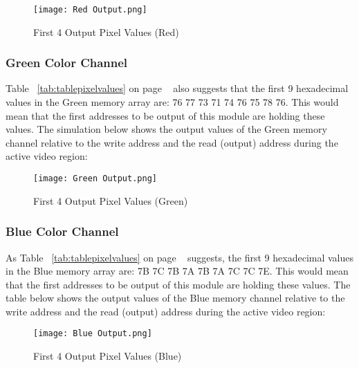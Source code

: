  \begin{figure}[H]
    \centering
    \texttt{[image: Red Output.png]}
    \caption{ First 4 Output Pixel Values (Red) }
    \label{fig:RedOutput}  
\end{figure}

\subsubsection{Green Color Channel}
\par Table ~\ref{tab:tablepixelvalues} on page ~\pageref{tab:tablepixelvalues} also suggests that the first 9 hexadecimal values in the Green memory array are: 76 77 73 71 74 76 75 78 76. This would mean that the first addresses to be output of this module are holding these values. The simulation below shows the output values of the Green memory channel relative to the write address and the read (output) address during the active video region:
 \newline

 \begin{figure}[H]
    \centering
    \texttt{[image: Green Output.png]}
    \caption{ First 4 Output Pixel Values (Green) }
    \label{fig:GreenOutput}  
\end{figure}

\subsubsection{Blue Color Channel}
\par As Table ~\ref{tab:tablepixelvalues} on page ~\pageref{tab:tablepixelvalues} suggests, the first 9 hexadecimal values in the Blue memory array are: 7B 7C 7B 7A 7B 7A 7C 7C 7E. This would mean that the first addresses to be output of this module are holding these values. The table below shows the output values of the Blue memory channel relative to the write address and the read (output) address during the active video region:
 \newline

\begin{figure}[H]
    \centering
    \texttt{[image: Blue Output.png]}
    \caption{ First 4 Output Pixel Values (Blue) }
    \label{fig:BlueOutput}  
\end{figure} 

